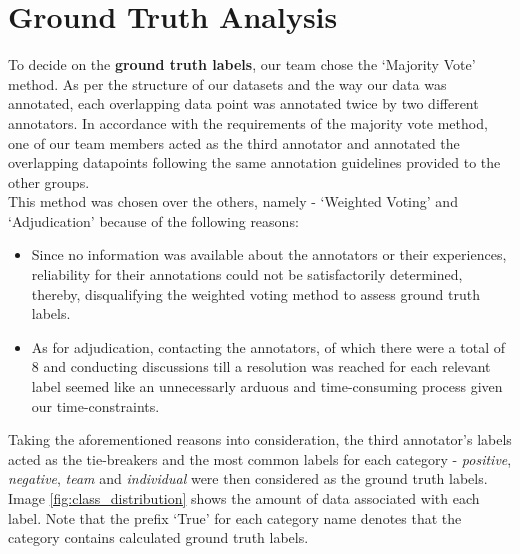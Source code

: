 \documentclass[titlepage]{article}
\begin{document}
\section{Ground Truth Analysis}
To decide on the \textbf{ground truth labels}, our team chose the
`Majority Vote' method. As per the structure of our datasets and the
way our data
was annotated, each overlapping data point was annotated twice by two
different annotators. In accordance with the requirements of the majority vote
method, one of our team members acted as the third annotator and
annotated the overlapping datapoints following the same annotation
guidelines provided
to the other groups.\\
\newline
This method was chosen over the others, namely - `Weighted Voting'
and `Adjudication' because of the following reasons:
\begin{itemize}
  \item Since no information was available about the annotators or
    their experiences, reliability for their annotations could not be
    satisfactorily
    determined, thereby, disqualifying the weighted voting method to
    assess ground truth labels.
  \item As for adjudication, contacting the annotators, of which
    there were a total of 8 and conducting discussions till a
    resolution was reached for
    each relevant label seemed like an unnecessarly arduous and
    time-consuming process given our time-constraints.
\end{itemize}
Taking the aforementioned reasons into consideration, the third
annotator's labels acted as the tie-breakers and the most common
labels for each category -
\emph{positive}, \emph{negative}, \emph{team} and \emph{individual}
were then considered as the ground truth labels.\\
\newline
Image \ref{fig:class_distribution} shows the amount of data
associated with each label. Note that the prefix `True' for each
category name denotes that the
category contains calculated ground truth labels.
\end{document}
